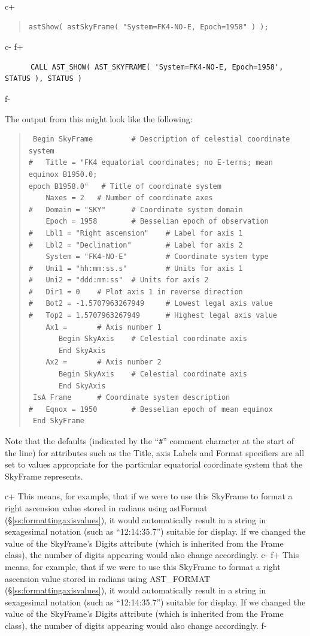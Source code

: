 \documentclass[twoside,11pt]{article}
\newcommand{\secref}[1]{\S\ref{#1}}
\newcommand{\secref}[1]{\ref{#1}}
\begin{document}
c+
\begin{quote}
\small
\begin{verbatim}
astShow( astSkyFrame( "System=FK4-NO-E, Epoch=1958" ) );
\end{verbatim}
\normalsize
\end{quote}
c-
f+
\small
\begin{verbatim}
      CALL AST_SHOW( AST_SKYFRAME( 'System=FK4-NO-E, Epoch=1958', STATUS ), STATUS )
\end{verbatim}
\normalsize
f-

The output from this might look like the following:

\begin{quote}
\begin{verbatim}
 Begin SkyFrame         # Description of celestial coordinate system
#   Title = "FK4 equatorial coordinates; no E-terms; mean equinox B1950.0; 
epoch B1958.0"   # Title of coordinate system
    Naxes = 2   # Number of coordinate axes
#   Domain = "SKY"      # Coordinate system domain
    Epoch = 1958        # Besselian epoch of observation
#   Lbl1 = "Right ascension"    # Label for axis 1
#   Lbl2 = "Declination"        # Label for axis 2
    System = "FK4-NO-E"         # Coordinate system type
#   Uni1 = "hh:mm:ss.s"         # Units for axis 1
#   Uni2 = "ddd:mm:ss"  # Units for axis 2
#   Dir1 = 0    # Plot axis 1 in reverse direction
#   Bot2 = -1.5707963267949     # Lowest legal axis value
#   Top2 = 1.5707963267949      # Highest legal axis value
    Ax1 =       # Axis number 1
       Begin SkyAxis    # Celestial coordinate axis
       End SkyAxis
    Ax2 =       # Axis number 2
       Begin SkyAxis    # Celestial coordinate axis
       End SkyAxis
 IsA Frame      # Coordinate system description
#   Eqnox = 1950        # Besselian epoch of mean equinox
 End SkyFrame
\end{verbatim}
\end{quote}

Note that the defaults (indicated by the ``\verb?#?'' comment
character at the start of the line) for attributes such as the Title,
axis Labels and Format specifiers are all set to values appropriate
for the particular equatorial coordinate system that the SkyFrame
represents.

c+
This means, for example, that if we were to use this SkyFrame to
format a right ascension value stored in radians using astFormat
(\secref{ss:formattingaxisvalues}), it would automatically result in a
string in sexagesimal notation (such as ``12:14:35.7'') suitable for
display.  If we changed the value of the SkyFrame's Digits attribute
(which is inherited from the Frame class), the number of digits
appearing would also change accordingly.
c-
f+
This means, for example, that if we were to use this SkyFrame to
format a right ascension value stored in radians using AST\_FORMAT
(\secref{ss:formattingaxisvalues}), it would automatically result in a
string in sexagesimal notation (such as ``12:14:35.7'') suitable for
display.  If we changed the value of the SkyFrame's Digits attribute
(which is inherited from the Frame class), the number of digits
appearing would also change accordingly.
f-
\end{document}

